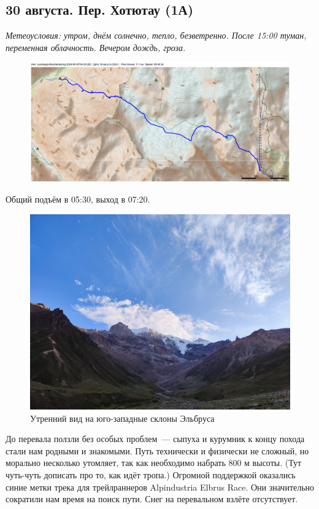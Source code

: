 \subsection{30 августа. Пер. Хотютау (1А)}
\textit{Метеоусловия: утром, днём солнечно, тепло, безветренно. После 15:00 туман, переменная облачность. Вечером дождь, гроза.}

\begin{figure}[h!]
	\centering
	\includegraphics[angle=0, width=0.7\linewidth]{../pics/mini_maps/30}
	\label{fig:mini_30}
\end{figure}

Общий подъём в 05:30, выход в 07:20.

\begin{figure}[h!]
	\centering
	\includegraphics[width=0.7\linewidth]{../pics/IMG_20240830_063548}
	\caption{Утренний вид на юго-западные склоны Эльбруса}
	\label{fig:IMG_20240830_063548}
\end{figure}

До перевала ползли без особых проблем~--- сыпуха и курумник к концу похода стали нам родными и знакомыми. Путь технически и физически не сложный, но морально несколько утомляет, так как необходимо набрать 800 м высоты. \alert{(Тут чуть-чуть дописать про то, как идёт тропа.)} Огромной поддержкой оказались синие метки трека для трейлраннеров Alpindustria Elbrus Race. Они значительно сократили нам время на поиск пути. Снег на перевальном взлёте отсутствует.

